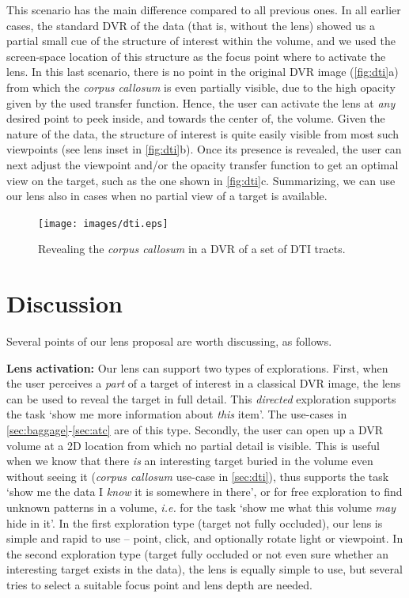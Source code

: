 This scenario has the main difference compared to all previous ones. In all earlier cases, the standard DVR of the data (that is, without the lens) showed us a partial small cue of the structure of interest within the volume, and we used the screen-space location of this structure as the focus point where to activate the lens. In this last scenario, there is no point in the original DVR image (\autoref{fig:dti}a) from which the \emph{corpus callosum} is even partially visible, due to the high opacity given by the used transfer function. Hence, the user can activate the lens at \emph{any} desired point to peek inside, and towards the center of, the volume. Given the nature of the data, the structure of interest is quite easily visible from most such viewpoints (see lens inset in \autoref{fig:dti}b). Once its presence is revealed, the user can next adjust the viewpoint and/or the opacity transfer function to get an optimal view on the target, such as the one shown in \autoref{fig:dti}c. Summarizing, we can use our lens also in cases when no partial view of a target is available. 

\begin{figure}
\centering
\texttt{[image: images/dti.eps]}
\caption{Revealing the \emph{corpus callosum} in a DVR of a set of DTI tracts.}
\label{fig:dti}
\end{figure}

%
\section{Discussion}
\label{sec:discussion}
%
%
Several points of our lens proposal are worth discussing, as follows.


\par \textbf{Lens activation:} Our lens can support two types of explorations. First, when the user perceives a \emph{part} of a target of interest in a classical DVR image, the lens can be used to reveal the target in full detail. This \emph{directed} exploration supports the task `show me more information about \emph{this} item'. The use-cases in \autoref{sec:baggage}-\autoref{sec:atc} are of this type. Secondly, the user can open up a DVR volume at a 2D location from which no partial detail is visible. This is useful when we know that there \emph{is} an interesting target buried in the volume even without seeing it (\emph{corpus callosum} use-case in \autoref{sec:dti}), thus supports the task `show me the data I \emph{know} it is somewhere in there', or for free exploration to find unknown patterns in a volume, \emph{i.e.} for the task `show me what this volume \emph{may} hide in it'. In the first exploration type (target not fully occluded), our lens is simple and rapid to use -- point, click, and optionally rotate light or viewpoint. In the second exploration type (target fully occluded or not even sure whether an interesting target exists in the data), the lens is equally simple to use, but several tries to select a suitable focus point and lens depth are needed.

